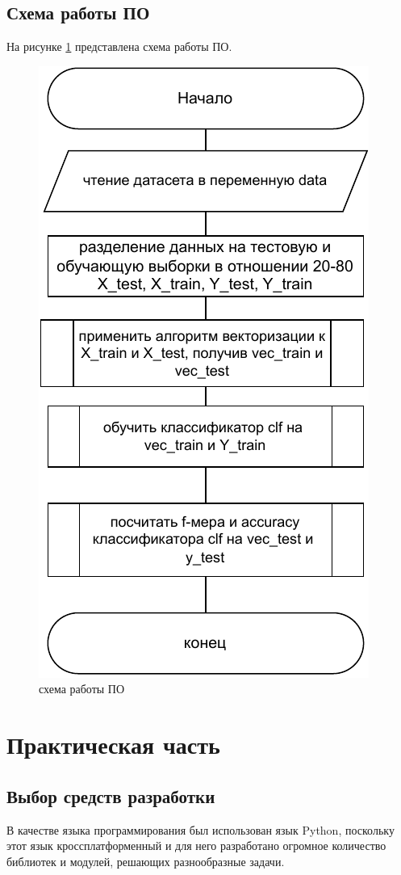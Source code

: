 \documentclass[12pt]{report}
\begin{document}
\section{Схема работы ПО}
На рисунке \ref{fig:scheme} представлена схема работы ПО.
\begin{figure}[h!]
  \centering
  \includegraphics[scale = 0.5]{scheme.pdf}
  \caption{схема работы ПО}
  \label{fig:scheme}
\end{figure}
\chapter{Практическая часть}

\section{Выбор средств разработки}
В качестве языка программирования был использован язык Python, поскольку этот язык кроссплатформенный и для него разработано огромное количество библиотек и модулей, решающих разнообразные задачи. 
\end{document}
